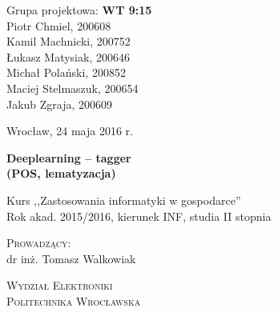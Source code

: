 \noindent
\begin{minipage}[t]{.5\linewidth}
	\begin{flushleft}
		Grupa projektowa: \textbf{WT 9:15}\\
		\vspace{0.8cm}
		Piotr Chmiel, 200608\\
		Kamil Machnicki, 200752\\
		Łukasz Matysiak, 200646\\
		Michał Polański, 200852\\
		Maciej Stelmaszuk, 200654\\
		Jakub Zgraja, 200609\\
	\end{flushleft} 
\end{minipage}%
\begin{minipage}[t]{.5\linewidth}
	\begin{flushright}
		Wrocław, 24 maja 2016 r.\\
		\vspace{.35cm}

	\end{flushright}
\end{minipage}

\vspace{3.0cm}

\begin{center}
	{\Huge\bf Deeplearning -- tagger}\\
	{\Large\bf (POS, lematyzacja)}\\
		
\end{center}

\begin{center}
	{\large Kurs ,,Zastosowania informatyki w gospodarce''}\\
	{\large Rok akad. 2015/2016, kierunek INF, studia II stopnia}
\end{center}

\vspace{2cm}
\begin{center}
		\textsc{Prowadzący:}\\
		dr inż. Tomasz Walkowiak
\end{center}

\vfill
\begin{center}
	{\Large \textsc{Wydział Elektroniki}}\\
	{\Large \textsc{Politechnika Wrocławska}}
\end{center}
